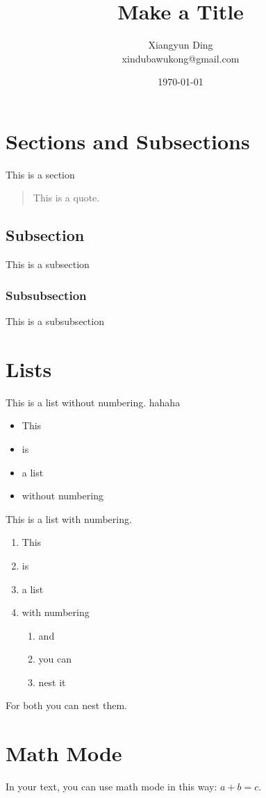 \documentclass{article}[12pt]
\title{Make a Title}
\date{\today}
\author{Xiangyun Ding\\xindubawukong@gmail.com}
\begin{document}
\maketitle

\tableofcontents

\section{Sections and Subsections}
This is a section
\begin{quote}
  This is a quote.
\end{quote}

\subsection{Subsection}
This is a subsection
\subsubsection{Subsubsection}
This is a subsubsection

\section{Lists}
This is a list without numbering.
hahaha
\begin{itemize}
  \item This
  \item is
  \item a list
  \item without numbering
\end{itemize}

This is a list with numbering.

\begin{enumerate}
  \item This
  \item is
  \item a list
  \item with numbering
  \begin{enumerate}
    \item and
    \item you can
    \item nest it
  \end{enumerate}
\end{enumerate}

For both you can nest them.

\section{Math Mode}
In your text, you can use math mode in this way: $a+b=c$.
\end{document}
